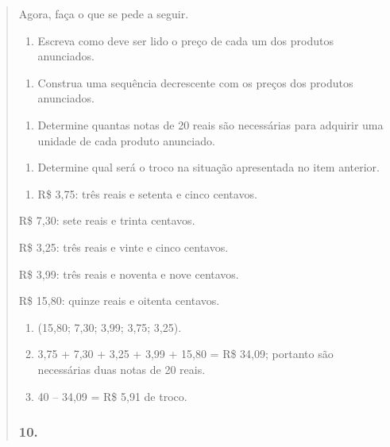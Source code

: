 \begin{enumerate}
\begin{escolha}
\begin{enumerate}
\begin{itemize}
\begin{itemize}
\begin{escolha}
\begin{quote}
\begin{escolha}
Agora, faça o que se pede a seguir.

\begin{enumerate}
\def\labelenumi{\alph{enumi})}
\item
  Escreva como deve ser lido o preço de cada um dos produtos anunciados.
\end{enumerate}

\begin{enumerate}
\def\labelenumi{\alph{enumi})}
\item
  Construa uma sequência decrescente com os preços dos produtos
  anunciados.
\end{enumerate}

\begin{enumerate}
\def\labelenumi{\alph{enumi})}
\item
  Determine quantas notas de 20 reais são necessárias para adquirir uma unidade de
  cada produto anunciado.
\end{enumerate}

\begin{enumerate}
\def\labelenumi{\alph{enumi})}
\item
  Determine qual será o troco na situação apresentada no item anterior.
\end{enumerate}

\begin{enumerate}
\def\labelenumi{\alph{enumi})}
\item
  R\$ 3,75: três reais e setenta e cinco centavos.
\end{enumerate}

R\$ 7,30: sete reais e trinta centavos.

R\$ 3,25: três reais e vinte e cinco centavos.

R\$ 3,99: três reais e noventa e nove centavos.

R\$ 15,80: quinze reais e oitenta centavos.

\begin{enumerate}
\def\labelenumi{\alph{enumi})}
\item
  (15,80; 7,30; 3,99; 3,75; 3,25).
\item
  3,75 + 7,30 + 3,25 + 3,99 + 15,80 = R\$ 34,09; portanto são necessárias duas notas de 20
  reais.
\item
  40 -- 34,09 = R\$ 5,91 de troco.
\end{enumerate}

\subsubsection{10.}\label{section-74}


\end{escolha}
\end{quote}
\end{escolha}
\end{itemize}
\end{itemize}
\end{enumerate}
\end{escolha}
\end{enumerate}
